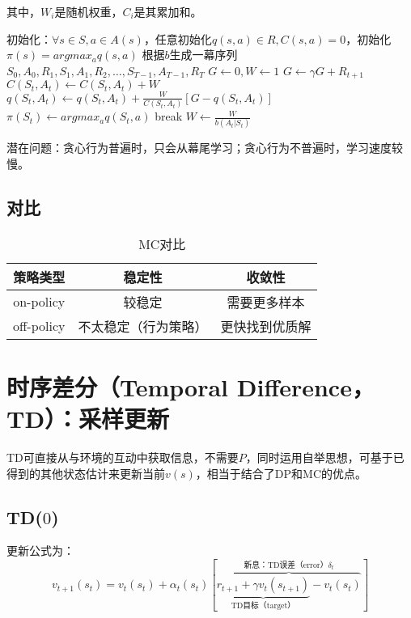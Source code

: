 \documentclass[
12pt, %
a4paper, 
oneside, %
headinclude,footinclude, %
]{scrartcl}
\begin{document}
其中，$ W_i $是随机权重，$ C_i $是其累加和。
\begin{myalgorithm}
\State 初始化：$ \forall s \in S, a \in A(s) $，任意初始化$ q(s, a) \in R, C(s, a) = 0 $，初始化$ \pi(s) = argmax_a q(s, a) $ 
\Loop
\State 根据$ b $生成一幕序列$ S_0, A_0, R_1, S_1, A_1, R_2, \dots, S_{T - 1}, A_{T - 1}, R_T $ 
\State $ G \gets 0, W \gets 1 $
\State $ G \gets \gamma G + R_{t + 1} $
\State $ C(S_t, A_t) \gets C(S_t, A_t) + W $
\State $ q(S_t ,A_t) \gets q(S_t, A_t) + \frac{W}{C(S_t, A_t)}[G - q(S_t, A_t)] $ 
\State $ \pi(S_t) \gets argmax_a q(S_t,a) $
\State break 
\EndIf
\State $ W \gets \frac{W}{b(A_t|S_t)} $ 
\EndFor
\EndLoop
\end{myalgorithm}

潜在问题：贪心行为普遍时，只会从幕尾学习；贪心行为不普遍时，学习速度较慢。
\subsection[对比]{对比}
\begin{table}[H]
\centering
\begin{tabular}{|c|c|c|}
\hline
策略类型 & 稳定性 & 收敛性 \\
\hline
on-policy & 较稳定 & 需要更多样本 \\
\hline
off-policy & 不太稳定（行为策略） & 更快找到优质解 \\
\hline
\end{tabular}
\caption{MC对比}
\end{table}
\section[时序差分]{时序差分（Temporal Difference，TD）：采样更新}
TD可直接从与环境的互动中获取信息，不需要$ P $，同时运用自举思想，可基于已得到的其他状态估计来更新当前$ v(s) $，相当于结合了DP和MC的优点。
\subsection[TD($ 0 $)]{TD($ 0 $)}
更新公式为：
$$ v_{t + 1}(s_t) = v_t(s_t) + \alpha_t(s_t)[\overbrace{\underbrace{r_{t + 1} + \gamma v_t(s_{t + 1})}_{\text{TD目标（target）}} - v_t(s_t)}^{\text{新息：TD误差（error）}\delta_t}] $$
\end{document}
